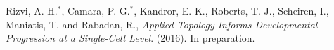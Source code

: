 \documentclass[letterpaper,10pt,english]{/usr/share/sphinx/texinputs/sphinxhowto}
\begin{document}
        

        \renewcommand{\indexname}{Index}
        \printindex

    \begin{thebibliography}{99}
     Rizvi, A. H.${}^*$, Camara, P. G.${}^*$, Kandror, E. K., Roberts, T. J., Scheiren, I., Maniatis, T. and Rabadan, R., \emph{Applied Topology Informs Developmental Progression at a Single-Cell Level}. (2016). In preparation.
    \end{thebibliography}
    
\end{document}
